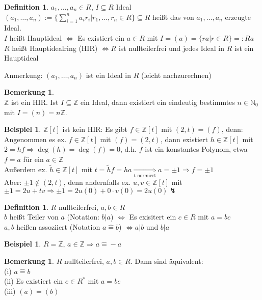 \documentclass[10pt,a4paper,numbers=endperiod]{scrartcl}
\theoremstyle{definition}
\newtheorem{defi}[satz]{Definition}
\newtheorem{bem}[satz]{Bemerkung}
\newtheorem{bsp}[satz]{Beispiel}
\def\NN{{\mathbb N}}
\def\ZZ{{\mathbb Z}}
\begin{document}
\begin{defi}
	$a_1, \ldots, a_n \in R$, $I \subseteq R$ Ideal\\
	$(a_1, \ldots, a_n) := \{\sum\limits_{i = 1}^n a_ir_i| r_1, \ldots, r_n \in R\} \subseteq R$ heißt das von $a_1, \ldots, a_n$ erzeugte Ideal.\\
	$I$ heißt Hauptideal $\Leftrightarrow$ Es existiert ein $a \in R$ mit $I = (a) = \{ra| r \in R\} =: Ra$\\
	$R$ heißt Hauptidealring (HIR) $\Leftrightarrow R$ ist nullteilerfrei und jedes Ideal in $R$ ist ein Hauptideal
\end{defi}

Anmerkung: $(a_1, \ldots, a_n)$ ist ein Ideal in $R$ (leicht nachzurechnen) 

\begin{bem}
	$ $\\
	$\ZZ$ ist ein HIR. Ist $I \subseteq \ZZ$ ein Ideal, dann existiert ein eindeutig bestimmtes $n \in \NN_0$ mit $I = (n) = n\ZZ$. 
\end{bem}

\begin{bsp}
	$\ZZ[t]$ ist kein HIR: Es gibt $f \in \ZZ[t]$ mit $(2,t) = (f)$, denn:\\
	Angenommen es ex. $f \in \ZZ[t]$ mit $(f) = (2,t)$, dann existiert $h \in \ZZ[t]$ mit $2 = hf \Rightarrow \deg(h) = \deg(f) = 0$, d.h. $f$ ist ein konstantes Polynom, etwa $f = a$ für ein $a \in \ZZ$\\
	Außerdem ex. $\tilde{h} \in \ZZ[t]$ mit $t = \tilde{h} f = ha \underset{t \text{ normiert}}{\Rightarrow} a = \pm 1 \Rightarrow f = \pm 1$\\
	Aber: $\pm 1 \notin (2,t)$, denn andernfalls ex. $u,v \in \ZZ[t]$ mit $\pm 1 = 2u+ tv \Rightarrow \pm 1= 2u(0) + 0 \cdot v(0) = 2u(0) \lightning$
\end{bsp}

\begin{defi}
	$R$ nullteilerfrei, $a,b \in R$\\
	$b$ heißt Teiler von $a$ (Notation: $b|a$) $\Leftrightarrow$ Es exisitert ein $c \in R$ mit $a = bc$\\
	$a,b$ heißen assoziiert (Notation $a \widehat{=} b$) $\Leftrightarrow a|b$ und $b|a$
\end{defi}

\begin{bsp}
	$R = \ZZ$, $a \in \ZZ \Rightarrow a \widehat{=} -a$
\end{bsp}

\begin{bem}
	$R$ nullteilerfrei, $a,b \in R$. Dann sind äquivalent:\\
	(i) $a \widehat{=} b$\\
	(ii) Es existiert ein $e \in R^*$ mit $a = be$\\
	(iii) $(a) = (b)$
\end{bem}
\end{document}
